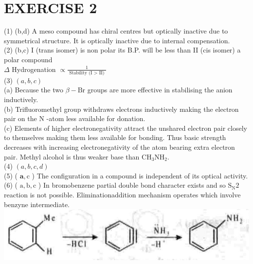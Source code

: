 \documentclass[10pt]{article}
\begin{document}
\section*{EXERCISE 2}
(1) (b,d) A meso compound has chiral centres but optically inactive due to symmetrical structure. It is optically inactive due to internal compensation.\\
(2) (b,c) I (trans isomer) is non polar its B.P. will be less than II (cis isomer) a polar compound\\
$\Delta$ Hydrogenation $\propto \frac{1}{\text { Stability (I }>\text { II) }}$\\
(3) $(a, b, c)$\\
(a) Because the two $\beta-\mathrm{Br}$ groups are more effective in stabilising the anion inductively.\\
(b) Trifluoromethyl group withdraws electrons inductively making the electron pair on the N -atom less available for donation.\\
(c) Elements of higher electronegativity attract the unshared electron pair closely to themselves making them less available for bonding. Thus basic strength decreases with increasing electronegativity of the atom bearing extra electron pair. Methyl alcohol is thus weaker base than $\mathrm{CH}_{3} \mathrm{NH}_{2}$.\\
(4) $(a, b, c, d)$\\
(5) ( $\mathbf{a}, \mathrm{c}$ ) The configuration in a compound is independent of its optical activity.\\
(6) ( $\mathrm{a}, \mathrm{b}, \mathrm{c}$ ) In bromobenzene partial double bond character exists and so $\mathrm{S}_{\mathrm{N}} 2$ reaction is not possible. Eliminationaddition mechanism operates which involve benzyne intermediate.\\
\includegraphics[max width=\textwidth, center]{2025_01_28_8470952b98110cec3aabg-164(3)}\\
\end{document}
